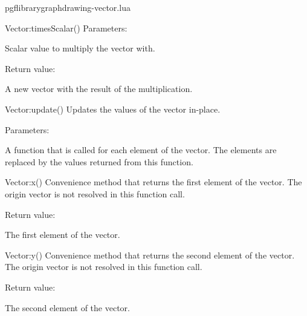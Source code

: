 \begin{filedescription}{pgflibrarygraphdrawing-vector.lua}
\begin{luacommand}{{Vector:timesScalar}()}
Parameters:
\begin{parameterdescription}
	\item[\meta{scalar}] Scalar value to multiply the vector with. 
\end{parameterdescription}


Return value:
\begin{parameterdescription} 
  \item[] A new vector with the result of the multiplication. 
\end{parameterdescription}


\end{luacommand}
\begin{luacommand}{{Vector:update}()}
Updates the values of the vector in-place. 

Parameters:
\begin{parameterdescription}
	\item[\meta{update\_function}] A function that is called for each element of the vector. The elements are replaced by the values returned from this function. 
\end{parameterdescription}



\end{luacommand}
\begin{luacommand}{{Vector:x}()}
Convenience method that returns the first element of the vector.  The origin vector is not resolved in this function call. 


Return value:
\begin{parameterdescription} 
  \item[] The first element of the vector. 
\end{parameterdescription}


\end{luacommand}
\begin{luacommand}{{Vector:y}()}
Convenience method that returns the second element of the vector.  The origin vector is not resolved in this function call. 


Return value:
\begin{parameterdescription} 
  \item[] The second element of the vector. 
\end{parameterdescription}


\end{luacommand}

\end{filedescription}